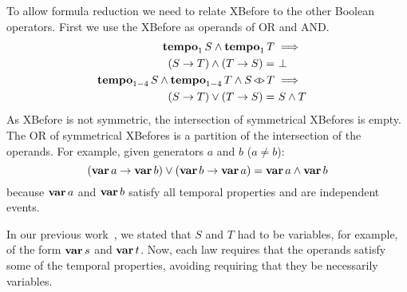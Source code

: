 To allow formula reduction we need to relate \ac{XBefore} to the other Boolean operators.
First we use the \ac{XBefore} as operands of \ac{OR} and \ac{AND}.
%
\begin{subequations}
\begin{align}
\tempo[1]{S} \land \tempo[1]{T}&\implies\nonumber\\
  \parsin{\xbefore{S}{T}} \land \parsin{\xbefore{T}{S}} =&~
  \bot &
  \label{thm:xbefore-inf-equiv-bot}\\
%
\tempo{S} \land \tempo{T} \land \independentevents{S}{T}&\implies\nonumber\\
  \parsin{\xbefore{S}{T}} \lor \parsin{\xbefore{T}{S}} =&~
  S \land T &
  \label{thm:xbefore-sup-equiv-inf}
%
\end{align}
\end{subequations}
%
As \ac{XBefore} is not symmetric, the intersection of symmetrical \acp{XBefore} is empty.
The \ac{OR} of symmetrical \acp{XBefore} is a partition of the intersection of the operands.
For example, given generators $a$ and $b$ ($a \neq b$):
\begin{equation}
\left(\operatorname{\mathbf{var}} a \rightarrow \operatorname{\mathbf{var}} b\right) \lor \left(\operatorname{\mathbf{var}} b \rightarrow \operatorname{\mathbf{var}} a\right) = \operatorname{\mathbf{var}} a \land \operatorname{\mathbf{var}} b
\end{equation}
%
because $\operatorname{\mathbf{var}} a$ and $\operatorname{\mathbf{var}} b$ satisfy all temporal properties and are independent events.

In our previous work~\cite{DM2015}, we stated that $S$ and $T$ had to be variables, for example, of the form $\operatorname{\mathbf{var}} s$ and $\operatorname{\mathbf{var}} t$.
Now, each law requires that the operands satisfy some of the temporal properties, avoiding requiring that they be necessarily variables.


